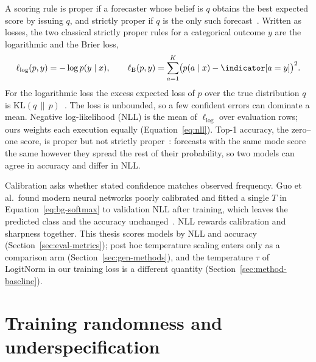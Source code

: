 A scoring rule is proper if a forecaster whose belief is $q$ obtains
the best expected score by issuing $q$, and strictly proper if $q$ is
the only such forecast~\cite{gneiting2007strictly}. Written as losses,
the two classical strictly proper rules for a categorical outcome $y$
are the logarithmic and the Brier loss,
\begin{equation}
  \ell_{\log}(p,y)=-\log p(y\mid x),
  \qquad
  \ell_{\mathrm{B}}(p,y)=\sum_{a=1}^{K}\bigl(p(a\mid x)-\indicator[a=y]\bigr)^2 .
  \label{eq:bg-scores}
\end{equation}
For the logarithmic loss the excess expected loss of $p$ over the true
distribution $q$ is $\mathrm{KL}(q\,\|\,p)$~\cite{gneiting2007strictly}.
The loss is unbounded, so a few confident errors can dominate a mean.
Negative log-likelihood (NLL) is the mean of $\ell_{\log}$ over
evaluation rows; ours weights each execution equally
(Equation~\ref{eq:nll}). Top-1 accuracy, the zero--one score, is proper
but not strictly proper~\cite{gneiting2007strictly}: forecasts with the
same mode score the same however they spread the rest of their
probability, so two models can agree in accuracy and differ in NLL.

Calibration asks whether stated confidence matches observed frequency.
Guo et al.\ found modern neural networks poorly calibrated and fitted a
single $T$ in Equation~\ref{eq:bg-softmax} to validation NLL after
training, which leaves the predicted class and the accuracy
unchanged~\cite{guo2017calibration}.
NLL rewards calibration and sharpness together. This thesis scores
models by NLL and accuracy (Section~\ref{sec:eval-metrics}); post hoc
temperature scaling enters only as a comparison arm
(Section~\ref{sec:gen-methods}), and the temperature $\tau$ of
LogitNorm in our training loss is a different quantity
(Section~\ref{sec:method-baseline}).

\section{Training randomness and underspecification}
\label{sec:bg-seeds}

